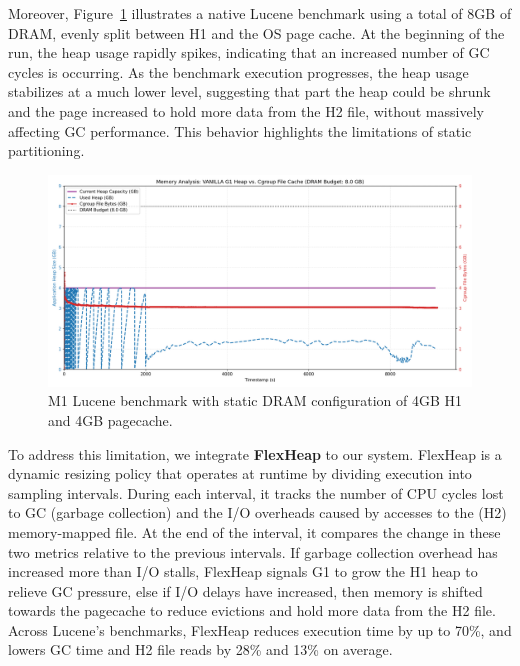 Moreover, Figure~\ref{fig:vanilla-dram-underutilization} illustrates a native
Lucene benchmark using a total of 8GB of DRAM, evenly split between H1 and the
OS page cache. At the beginning of the run, the heap usage rapidly spikes,
indicating that an increased number of GC cycles is occurring. As the benchmark execution progresses, the heap usage
stabilizes at a much lower level, suggesting that part the heap could be shrunk 
and the page increased to hold more data from the H2 file, without massively affecting GC
performance. This behavior highlights the limitations of static partitioning.
\begin{figure}[htbp]
	\centering
	\includegraphics[width=1\linewidth]{fig/combined_memory_timeline_vanilla_g1.png}
	\caption{
		M1 Lucene benchmark with static DRAM configuration of 4GB H1 and 4GB pagecache.
	}
	\label{fig:vanilla-dram-underutilization}
\end{figure}

To address this limitation, we integrate \textbf{FlexHeap} to our system.
FlexHeap is a dynamic resizing policy that operates at runtime by
dividing execution into sampling intervals. During each interval, it tracks the
number of CPU cycles lost to GC (garbage collection) and the I/O overheads caused by
accesses to the (H2) memory-mapped file. At the end of the interval, it compares the
change in these two metrics relative to the previous intervals. If garbage
collection overhead has increased more than I/O stalls, FlexHeap signals G1 to grow
the H1 heap to relieve GC pressure, else if I/O delays have increased,
then memory is shifted towards the pagecache to reduce evictions and hold
more data from the H2 file. Across Lucene's benchmarks, FlexHeap reduces execution time by
up to 70\%, and lowers GC time and H2 file reads by 28\% and 13\% on average.



